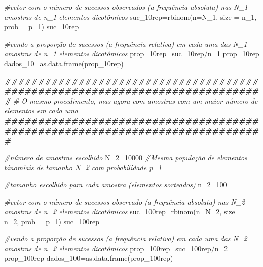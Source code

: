 \documentclass[
]{book}
\newenvironment{Shaded}{\begin{snugshade}}{\end{snugshade}}
\newcommand{\AttributeTok}[1]{\textcolor[rgb]{0.77,0.63,0.00}{#1}}
\newcommand{\CommentTok}[1]{\textcolor[rgb]{0.56,0.35,0.01}{\textit{#1}}}
\newcommand{\DecValTok}[1]{\textcolor[rgb]{0.00,0.00,0.81}{#1}}
\newcommand{\DocumentationTok}[1]{\textcolor[rgb]{0.56,0.35,0.01}{\textbf{\textit{#1}}}}
\newcommand{\FunctionTok}[1]{\textcolor[rgb]{0.00,0.00,0.00}{#1}}
\newcommand{\NormalTok}[1]{#1}
\newcommand{\OtherTok}[1]{\textcolor[rgb]{0.56,0.35,0.01}{#1}}
\newcommand{\SpecialCharTok}[1]{\textcolor[rgb]{0.00,0.00,0.00}{#1}}
\begin{document}
\begin{Shaded}
\begin{Highlighting}[]
\CommentTok{\#vetor com o número de sucessos observados (a frequência absoluta) nas N\_1 amostras de n\_1 elementos dicotômicos}
\NormalTok{suc\_10rep}\OtherTok{=}\FunctionTok{rbinom}\NormalTok{(}\AttributeTok{n=}\NormalTok{N\_1, }\AttributeTok{size =}\NormalTok{ n\_1, }\AttributeTok{prob =}\NormalTok{ p\_1)}
\NormalTok{suc\_10rep }

\CommentTok{\#vendo a proporção de sucessos (a frequência relativa) em cada uma das N\_1 amostras de n\_1 elementos dicotômicos}
\NormalTok{prop\_10rep}\OtherTok{=}\NormalTok{suc\_10rep}\SpecialCharTok{/}\NormalTok{n\_1}
\NormalTok{prop\_10rep}
\NormalTok{dados\_10}\OtherTok{=}\FunctionTok{as.data.frame}\NormalTok{(prop\_10rep)}

\DocumentationTok{\#\#\#\#\#\#\#\#\#\#\#\#\#\#\#\#\#\#\#\#\#\#\#\#\#\#\#\#\#\#\#\#\#\#\#\#\#\#\#\#\#\#\#\#\#\#\#\#\#\#\#\#\#\#\#\#\#\#\#\#\#\#\#\#\#\#\#\#\#\#\#\#\#\#\#\#\#}
\CommentTok{\# O mesmo procedimento, mas agora com amostras com um maior número de elementos em cada uma}
\DocumentationTok{\#\#\#\#\#\#\#\#\#\#\#\#\#\#\#\#\#\#\#\#\#\#\#\#\#\#\#\#\#\#\#\#\#\#\#\#\#\#\#\#\#\#\#\#\#\#\#\#\#\#\#\#\#\#\#\#\#\#\#\#\#\#\#\#\#\#\#\#\#\#\#\#\#\#\#\#\#}

\CommentTok{\#número de amostras escolhido}
\NormalTok{N\_2}\OtherTok{=}\DecValTok{10000} \CommentTok{\#Mesma população de elementos binomiais de tamanho N\_2 com probabilidade p\_1}

\CommentTok{\#tamanho escolhido para cada amostra (elementos sorteados)}
\NormalTok{n\_2}\OtherTok{=}\DecValTok{100} 

\CommentTok{\#vetor com o número de sucessos observado  (a frequência absoluta) nas N\_2 amostras de n\_2 elementos dicotômicos}
\NormalTok{suc\_100rep}\OtherTok{=}\FunctionTok{rbinom}\NormalTok{(}\AttributeTok{n=}\NormalTok{N\_2, }\AttributeTok{size =}\NormalTok{ n\_2, }\AttributeTok{prob =}\NormalTok{ p\_1)}
\NormalTok{suc\_100rep }

\CommentTok{\#vendo a proporção de sucessos (a frequência relativa) em cada uma das N\_2 amostras de n\_2 elementos dicotômicos}
\NormalTok{prop\_100rep}\OtherTok{=}\NormalTok{suc\_100rep}\SpecialCharTok{/}\NormalTok{n\_2}
\NormalTok{prop\_100rep}
\NormalTok{dados\_100}\OtherTok{=}\FunctionTok{as.data.frame}\NormalTok{(prop\_100rep)}
\end{Highlighting}
\end{Shaded}

\hfill\break
\end{document}
